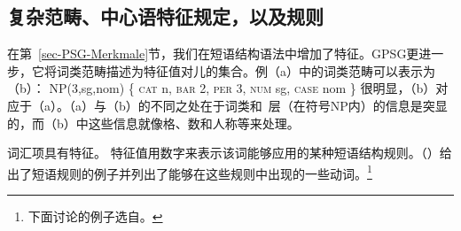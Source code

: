 \subsection{复杂范畴、中心语特征规定，以及\xbar 规则}
\label{sec-complex-categories-gpsg}

在第~\ref{sec-PSG-Merkmale}节，我们在短语结构语法中增加了特征。GPSG更进一步，它将词类范畴描述为特征值对儿的集合。例（a）中的词类范畴可以表示为（b）：
\eal
\ex NP(3,sg,{nom})
\ex \{ \textsc{cat} n, \textsc{bar} 2, \textsc{per} 3, \textsc{num} sg, \textsc{case} nom \} 
\zl
很明显，（b）对应于（a）。（a）与（b）的不同之处在于词类和\xbar ~层（在符号NP内）的信息是突显的，而（b）中这些信息就像格、数和人称等来处理。

词汇项具有\subcat 特征。 特征值用数字来表示该词能够应用的某种短语结构规则。（）给出了短语规则的例子并列出了能够在这些规则中出现的一些动词。\footnote{
下面讨论的例子选自。
}

